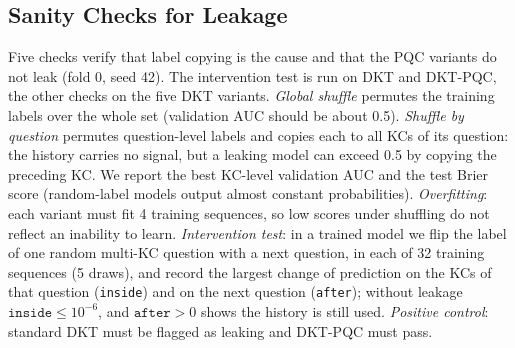 \subsection{Sanity Checks for Leakage}
\label{subsec:sanity}
Five checks verify that label copying is the cause and that the PQC variants do not leak (fold 0, seed 42). The intervention test is run on DKT and DKT-PQC, the other checks on the five DKT variants. 
\emph{Global shuffle} permutes the training labels over the whole set (validation AUC should be about 0.5). 
\emph{Shuffle by question} permutes question-level labels and copies each to all KCs of its question: the history carries no signal, but a leaking model can exceed 0.5 by copying the preceding KC. 
We report the best KC-level validation AUC and the test Brier score (random-label models output almost constant probabilities). 
\emph{Overfitting}: each variant must fit 4 training sequences, so low scores under shuffling do not reflect an inability to learn. 
\emph{Intervention test}: in a trained model we flip the label of one random multi-KC question with a next question, in each of 32 training sequences (5 draws), and record the largest change of prediction on the KCs of that question (\texttt{inside}) and on the next question (\texttt{after}); without leakage $\texttt{inside}\le10^{-6}$, and $\texttt{after}>0$ shows the history is still used. 
\emph{Positive control}: standard DKT must be flagged as leaking and DKT-PQC must pass.